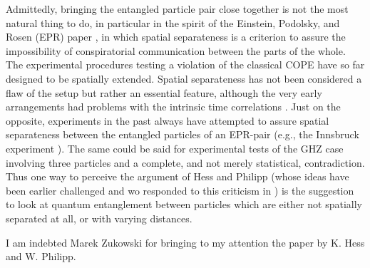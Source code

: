 \documentclass{epl}
\begin{document}
Admittedly, bringing the entangled particle pair close together is not
the most natural thing to do, in particular in the spirit of
the  Einstein, Podolsky, and  Rosen
(EPR) paper \cite{epr},
in which spatial separateness is a criterion to assure the impossibility of
conspiratorial communication between the parts of the whole.
The experimental procedures testing a violation of the classical
COPE have so far designed to be spatially extended.
Spatial separateness has not been considered a flaw
of the setup but rather an essential feature,
although the very early arrangements
had problems with the intrinsic time correlations \cite{zeilinger-86}.
Just on the opposite, experiments in the past always have attempted to assure
spatial separateness between the entangled particles of an EPR-pair
(e.g., the Innsbruck experiment \cite{zeilinger-epr-99}).
The same could be said for experimental tests
of the GHZ case involving
three particles and a complete, and not merely statistical, contradiction.
Thus one way to perceive the argument of
Hess and Philipp \cite{Hess&Philipp2002}
(whose ideas have been earlier challenged
\cite{Gill-Weihs-Z-Z} and wo responded to this criticism in
\cite{Hess&Philipp2002a})
is the suggestion to look at quantum entanglement
between particles which are either not spatially separated at all,
or with varying distances.

\acknowledgments
I am indebted Marek Zukowski for bringing to my attention the paper by K. Hess and W. Philipp.


%
%
%
%
\end{document}
